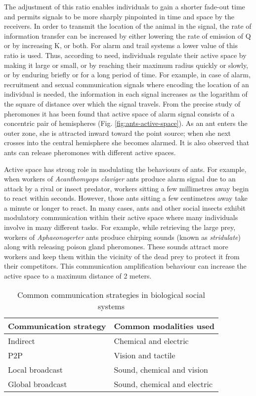 The adjustment of this ratio enables individuals to gain a shorter fade-out time and permits signals to be more sharply pinpointed in time and space by the receivers. In order to transmit the location of the animal in the signal, the rate of information transfer can be increased by either lowering the rate of emission of Q or by increasing K, or both. For alarm and trail systems a lower value of this ratio is used. Thus, according to need, individuals regulate their active space by making it large or small, or by reaching their maximum radius quickly or slowly, or by enduring briefly or for a long period of time. For example, in case of alarm, recruitment and sexual communication signals where encoding the location of an individual is needed, the information in each signal increases as the logarithm of the square of distance over which the signal travels. From the precise study of pheromones it has been found that active space of alarm signal consists of a concentric pair of hemispheres (Fig. \ref{fig:ants-active-space}). As an ant enters the outer zone, she is attracted inward toward the point source; when she next crosses into the central hemisphere she becomes alarmed. It is also observed that ants can release pheromones with different active spaces.

Active space has strong role in modulating the behaviours of ants. For example, when workers of {\em Acanthomyops claviger} ants produce alarm signal due to an attack by a rival or insect predator, workers sitting a few millimetres away begin to react within seconds. However, those ants sitting a few centimetres away take a minute or longer to react. In many cases, ants and other social insects exhibit modulatory communication within their active space where many individuals involve in many different tasks. For example, while retrieving the large prey, workers of {\em Aphaeonogerter} ants produce chirping sounds (known as \textit{stridulate}) along with releasing poison gland pheromones. These sounds attract more workers and keep them within the vicinity of the dead prey to protect it from their competitors. This communication amplification behaviour can increase the active space to a maximum distance of 2 meters.
\begin{table}
\caption{Common communication strategies in biological social systems}
\label{table:bio-comm-strategy}
\begin{center}
\begin{tabular}{|l|l|}
\hline 
\textbf{Communication strategy} & \textbf{Common modalities used}\\
\hline 
Indirect & Chemical and electric \\
P2P &  Vision and tactile\\
Local broadcast &  Sound, chemical and vision\\
Global broadcast & Sound, chemical and electric\\
\hline
\end{tabular}
\end{center}
\end{table}
